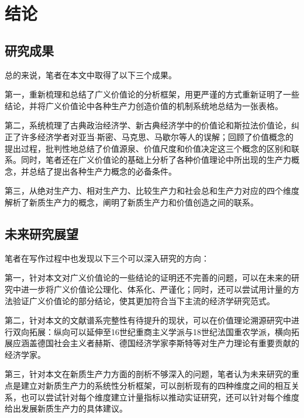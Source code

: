 
\chapter{结论}

\section{研究成果}

总的来说，笔者在本文中取得了以下三个成果。

第一，重新梳理和总结了广义价值论的分析框架，用更严谨的方式重新证明了一些结论，并将广义价值论中各种生产力创造价值的机制系统地总结为一张表格。

第二，系统梳理了古典政治经济学、新古典经济学中的价值论和斯拉法价值论，纠正了许多经济学者对亚当$\cdot$斯密、马克思、马歇尔等人的误解；回顾了价值概念的提出过程，批判性地总结了价值源泉、价值尺度和价值决定这三个概念的区别和联系。同时，笔者还在广义价值论的基础上分析了各种价值理论中所出现的生产力概念，并总结了提出各种生产力概念的必备条件。

第三，从绝对生产力、相对生产力、比较生产力和社会总和生产力对应的四个维度解析了新质生产力的概念，阐明了新质生产力和价值创造之间的联系。

\section{未来研究展望}

笔者在写作过程中也发现以下三个可以深入研究的方向：

第一，针对本文对广义价值论的一些结论的证明还不完善的问题，可以在未来的研究中进一步将广义价值论公理化、体系化、严谨化；同时，还可以尝试用计量的方法验证广义价值论的部分结论，使其更加符合当下主流的经济学研究范式。

第二，针对本文的文献谱系完整性有待提升的现状，可以在价值理论溯源研究中进行双向拓展：纵向可以延伸至16世纪重商主义学派与18世纪法国重农学派，横向拓展应涵盖德国社会主义者赫斯、德国经济学家李斯特\cite[33]{YangQiaoYuShengChanLiGaiNianCongSiMiDaoMaKeSiDeSiXiangPuXi2013}等对生产力理论有重要贡献的经济学家。

第三，针对本文在新质生产力方面的剖析不够深入的问题，笔者认为未来研究的重点是建立对新质生产力的系统性分析框架，可以剖析现有的四种维度之间的相互关系，也可以尝试针对每个维度建立计量指标以推动实证研究，还可以针对每个维度给出发展新质生产力的具体建议。